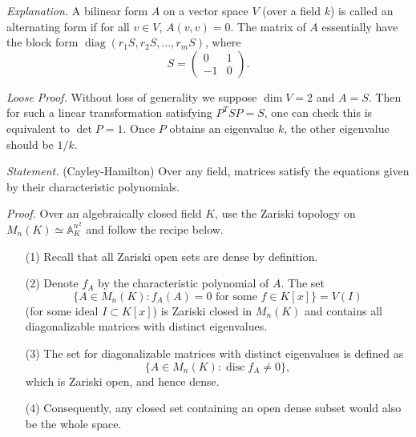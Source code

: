 \documentclass{mathproblems}
\begin{document}
\begin{questions}

\textit{Explanation.} A bilinear form $A$ on a vector space $V$ (over a field $k$) is called an alternating form if for all $v \in V$, $A(v, v)=0$. The matrix of $A$ essentially have the block form $\operatorname{diag}(r_1S,r_2S,\ldots,r_mS)$, where
$$
S=\begin{pmatrix}
0 & 1 \\ -1 & 0
\end{pmatrix}.
$$

\textit{Loose Proof.} Without loss of generality we suppose $\dim V=2$ and $A=S$. Then for such a linear transformation satisfying $P^TSP=S$, one can check this is equivalent to $\det P=1$. Once $P$ obtains an eigenvalue $k$, the other eigenvalue should be $1/k$.



{\color{violet}
\textit{Statement.} (Cayley-Hamilton) Over any field, matrices satisfy the equations given by their characteristic polynomials.}

\textit{Proof.} Over an algebraically closed field $K$, use the Zariski topology on $M_n(K)\simeq \mathbb{A}_K^{n^2}$ and follow the recipe below.
\begin{itemize}
\item[(1)] Recall that all Zariski open sets are dense by definition. 
\item[(2)] Denote $f_A$ by the characteristic polynomial of $A$. The set 
$$
\{A\in M_n(K):f_A(A)=0\text{ for some }f\in K[x]\}=V(I)
$$
(for some ideal $I\subset K[x]$) is Zariski closed in $M_n(K)$ and contains all diagonalizable matrices with distinct eigenvalues.
\item[(3)] The set for diagonalizable matrices with distinct eigenvalues is defined as 
$$
\{A\in M_n(K):\operatorname{disc} f_A\neq 0\},
$$
which is Zariski open, and hence dense. 
\item[(4)] Consequently, any closed set containing an open dense subset would also be the whole space.
\end{itemize}





\end{questions}
\end{document}
